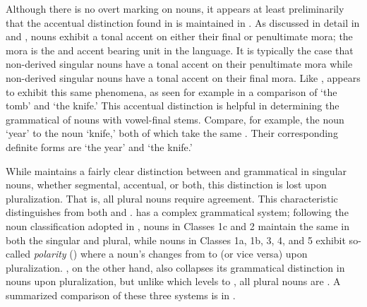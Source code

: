 \documentclass[output=paper,modfonts,nonflat,
colorlinks, citecolor=brown,
draftmode
]{langsci/langscibook}
\begin{document}
Although there is no overt  marking on  nouns, it appears at least preliminarily that the accentual  distinction found in  is maintained in . As discussed in detail in \citet{Hyman1981somali} and \citet{GreenMorrison2016},  nouns exhibit a tonal accent on either their final or penultimate mora; the mora is the  and accent bearing unit in the language. It is typically the case that non-derived  singular nouns have a tonal accent on their penultimate mora while non-derived  singular nouns have a tonal accent on their final mora. Like ,  appears to exhibit this same phenomena, as seen for example in a comparison of   `the tomb' and   `the knife.' This accentual distinction is helpful in determining the grammatical  of nouns with vowel-final stems. Compare, for example, the  noun  `year' to the  noun  `knife,' both of which take the same  . Their corresponding definite forms are  `the year' and  `the knife.'
 
 \newpage 
While  maintains a fairly clear distinction between  and  grammatical  in singular nouns, whether segmental, accentual, or both, this distinction is lost upon pluralization. That is, all plural nouns require   agreement. This characteristic distinguishes  from both  and .  has a complex grammatical  system; following the noun classification adopted in \citet{Greenetal2015}, nouns in Classes 1c and 2 maintain the same  in both the singular and plural, while nouns in Classes 1a, 1b, 3, 4, and 5 exhibit so-called \textit{ polarity} (\citealt{Meinhof1912}) where a noun's  changes from  to  (or vice versa) upon pluralization. , on the other hand, also collapses its grammatical  distinction in nouns upon pluralization, but unlike  which levels  to , all  plural nouns are . A summarized comparison of these three systems is in . 
 
\end{document}
